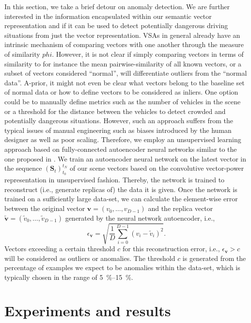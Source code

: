 In this section, we take a brief detour on anomaly detection.
We are further interested in the information encapsulated within our semantic vector representation and if it can be used to detect potentially dangerous driving situations from just the vector representation.
\acp{VSA} in general already have an intrinsic mechanism of comparing vectors with one another through the measure of similarity $phi$.
However, it is not clear if simply comparing vectors in terms of similarity to for instance the mean pairwise-similarity of all known vectors, or a subset of vectors considered \enquote{normal}, will differentiate outliers from the \enquote{normal data}.
A-prior, it might not even be clear what vectors belong to the baseline set of normal data or how to define vectors to be considered as inliers.
One option could be to manually define metrics such as the number of vehicles in the scene or a threshold for the distance between the vehicles to detect crowded and potentially dangerous situations.
However, such an approach suffers from the typical issues of manual engineering such as biases introduced by the human designer as well as poor scaling.
Therefore, we employ an unsupervised learning approach based on fully-connected autoencoder neural networks similar to the one proposed in \textcite{Chen2017}.
We train an autoencoder neural network on the latest vector in the sequence $(\mathbf{S}_{t})_{t_0}^{t_N}$ of our scene vectors based on the convolutive vector-power representation in unsupervised fashion.
Thereby, the network is trained to reconstruct (i.e., generate replicas of) the data it is given.
Once the network is trained on a sufficiently large data-set, we can calculate the element-wise error between the original vector $ \mathbf{v} = \left(v_{0}, \ldots, v_{D-1}\right)$ and the replica vector $ \tilde{\mathbf{v}} = \left(\tilde{v}_{0}, \ldots, \tilde{v}_{D-1}\right)$ generated by the neural network autoencoder, i.e.,
\begin{equation}
\label{eq:anom_error}
\epsilon_{ \mathbf{v}} = \sqrt{ \frac{1}{D} \sum\limits_{i=0}^{D-1} \left(v_{i} - \tilde{v}_{i}\right)^{2}}.
\end{equation}
Vectors exceeding a certain threshold $c$ for this reconstruction error, i.e., $\epsilon_{ \mathbf{v}} > c$ will be considered as outliers or anomalies.
The threshold $c$ is generated from the percentage of examples we expect to be anomalies within the data-set, which is typically chosen in the range of \SIrange{5}{15}{\percent}.

\section{Experiments and results}
\label{sec:experiments}


